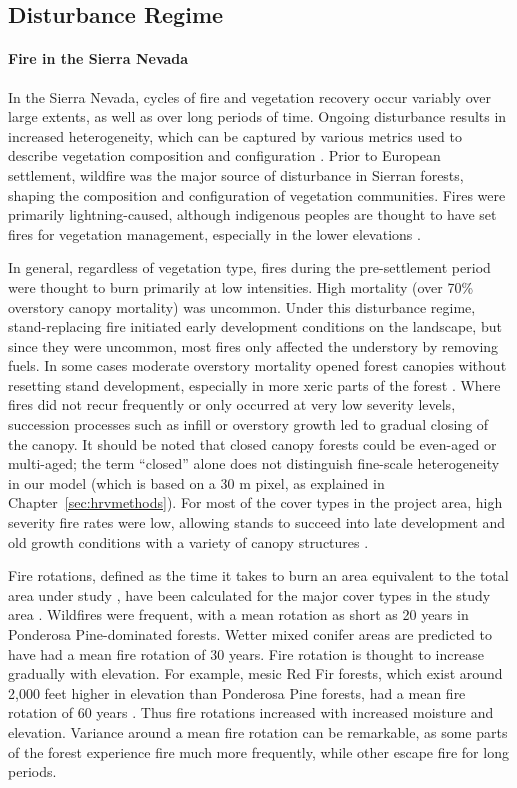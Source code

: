 \subsection{Disturbance Regime}
\paragraph{Fire in the Sierra Nevada}
In the Sierra Nevada, cycles of fire and vegetation recovery occur variably over large extents, as well as over long periods of time. Ongoing disturbance results in increased heterogeneity, which can be captured by various metrics used to describe vegetation composition and configuration \citep{Monica2008}. Prior to European settlement, wildfire was the major source of disturbance in Sierran forests, shaping the composition and configuration of vegetation communities. Fires were primarily lightning-caused, although indigenous peoples are thought to have set fires for vegetation management, especially in the lower elevations \citep{Safford2013}. 

In general, regardless of vegetation type, fires during the pre-settlement period were thought to burn primarily at low intensities. High mortality (over 70\% overstory canopy mortality) was uncommon. Under this disturbance regime, stand-replacing fire initiated early development conditions on the landscape, but since they were uncommon, most fires only affected the understory by removing fuels. In some cases moderate overstory mortality opened forest canopies without resetting stand development, especially in more xeric parts of the forest \citep{Mallek2013,Safford2014,SNEP1996,SNEP1996a}. Where fires did not recur frequently or only occurred at very low severity levels, succession processes such as infill or overstory growth led to gradual closing of the canopy. It should be noted that closed canopy forests could be even-aged or multi-aged; the term ``closed'' alone does not distinguish fine-scale heterogeneity in our model (which is based on a 30 m pixel, as explained in Chapter~\ref{sec:hrvmethods}). For most of the cover types in the project area, high severity fire rates were low, allowing stands to succeed into late development and old growth conditions with a variety of canopy structures \citep{SNEP1996,Mallek2013,Safford2014,SNEP1996a}. 

Fire rotations, defined as the time it takes to burn an area equivalent to the total area under study \citep{Agee1993}, have been calculated for the major cover types in the study area \citep{Mallek2013}. Wildfires were frequent, with a mean rotation as short as 20 years in Ponderosa Pine-dominated forests. Wetter mixed conifer areas are predicted to have had a mean fire rotation of 30 years. Fire rotation is thought to increase gradually with elevation. For example, mesic Red Fir forests, which exist around 2,000 feet higher in elevation than Ponderosa Pine forests, had a mean fire rotation of 60 years \citep{Mallek2013}. Thus fire rotations increased with increased moisture and elevation. Variance around a mean fire rotation can be remarkable, as some parts of the forest experience fire much more frequently, while other escape fire for long periods. 

